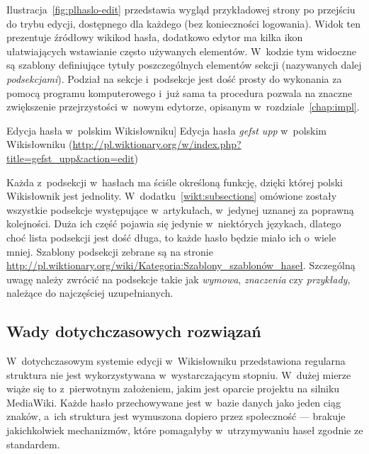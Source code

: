 Ilustracja~\ref{fig:plhaslo-edit} przedstawia wygląd przykładowej strony po przejściu do trybu edycji, dostępnego dla każdego (bez konieczności logowania). Widok ten prezentuje źródłowy wikikod hasła, dodatkowo edytor ma kilka ikon ułatwiających wstawianie często używanych elementów. W~kodzie tym widoczne są szablony definiujące tytuły poszczególnych elementów sekcji (nazywanych dalej \emph{podsekcjami}). Podział na sekcje i~podsekcje jest dość prosty do wykonania za pomocą programu komputerowego i~już sama ta procedura pozwala na znaczne zwiększenie przejrzystości w~nowym edytorze, opisanym w~rozdziale~\ref{chap:impl}.

\begin{illustration}
	\caption
		[Edycja hasła w~polskim Wikisłowniku]
		{Edycja hasła \emph{gefst upp} w~polskim Wikisłowniku (\protect\url{http://pl.wiktionary.org/w/index.php?title=gefst_upp&action=edit})}
	\label{fig:plhaslo-edit}
\end{illustration}

Każda z~podsekcji w~hasłach ma ściśle określoną funkcję, dzięki której polski Wikisłownik jest jednolity. W~dodatku~\ref{wikt:subsections} omówione zostały wszystkie podsekcje występujące w~artykułach, w~jedynej uznanej za poprawną kolejności. Duża ich część pojawia się jedynie w~niektórych językach, dlatego choć lista podsekcji jest dość długa, to każde hasło będzie miało ich o~wiele mniej. Szablony podsekcji zebrane są na stronie \url{http://pl.wiktionary.org/wiki/Kategoria:Szablony_szablonów_haseł}. Szczególną uwagę należy zwrócić na podsekcje takie jak \emph{wymowa}, \emph{znaczenia} czy \emph{przykłady}, należące do najczęściej uzupełnianych.

\subsection{Wady dotychczasowych rozwiązań}
\label{wikt:drawbacks}
W~dotychczasowym systemie edycji w~Wikisłowniku przedstawiona regularna struktura nie jest wykorzystywana w~wystarczającym stopniu. W~dużej mierze wiąże się to z~pierwotnym założeniem, jakim jest oparcie projektu na silniku MediaWiki. Każde hasło przechowywane jest w~bazie danych jako jeden ciąg znaków, a~ich struktura jest wymuszona dopiero przez społeczność --- brakuje jakichkolwiek mechanizmów, które pomagałyby w~utrzymywaniu haseł zgodnie ze standardem.

